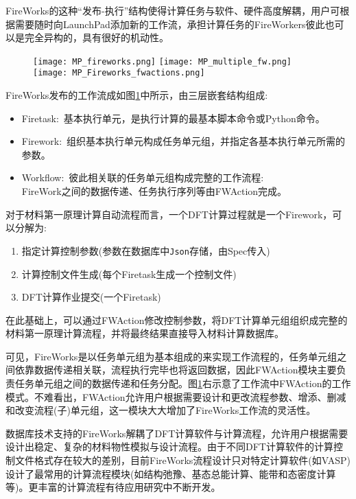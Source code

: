 \textrm{FireWorks}的这种“发布-执行”结构使得计算任务与软件、硬件高度解耦，用户可根据需要随时向\textrm{LaunchPad}添加新的工作流，承担计算任务的\textrm{FireWorkers}彼此也可以是完全异构的，具有很好的机动性。
\begin{figure}[h!]
\centering
\vspace*{-0.1in}
\texttt{[image: MP\_fireworks.png]}
\hskip 5pt
\texttt{[image: MP\_multiple\_fw.png]}
\hskip 5pt
\texttt{[image: MP\_Fireworks\_fwactions.png]}
\caption{\fontsize{7.2pt}{4.2pt}}%
\label{FireWorks_FW}
\end{figure} 
\textrm{FireWorks}发布的工作流成如图\ref{FireWorks_FW}中所示，由三层嵌套结构组成:
\begin{itemize}
	\item \textrm{Firetask}:~基本执行单元，是执行计算的最基本脚本命令或\textrm{Python}命令。
	\item \textrm{Firework}:~组织基本执行单元构成任务单元组，并指定各基本执行单元所需的参数。
	\item \textrm{Workflow}:~彼此相关联的任务单元组构成完整的工作流程:\\
		\textrm{FireWork}之间的数据传递、任务执行序列等由\textrm{FWAction}完成。
\end{itemize}
对于材料第一原理计算自动流程而言，一个\textrm{DFT}计算过程就是一个\textrm{Firework}，可以分解为:
\begin{enumerate}
	\item 指定计算控制参数(参数在数据库中\texttt{Json}存储，由\textrm{Spec}传入)
	\item 计算控制文件生成(每个\textrm{Firetask}生成一个控制文件)
	\item \textrm{DFT}计算作业提交(一个\textrm{Firetask})
\end{enumerate}
在此基础上，可以通过\textrm{FWAction}修改控制参数，将\textrm{DFT}计算单元组组织成完整的材料第一原理计算流程，并将最终结果直接导入材料计算数据库。

可见，\textrm{FireWorks}是以任务单元组为基本组成的来实现工作流程的，任务单元组之间依靠数据传递相关联，流程执行完毕也将返回数据，因此\textrm{FWAction}模块主要负责任务单元组之间的数据传递和任务分配。图\ref{FireWorks_FW}右示意了工作流中\textrm{FWAction}的工作模式。不难看出，\textrm{FWAction}允许用户根据需要设计和更改流程参数、增添、删减和改变流程(子)单元组，这一模块大大增加了\textrm{FireWorks}工作流的灵活性。

数据库技术支持的\textrm{FireWorks}解耦了\textrm{DFT}计算软件与计算流程，允许用户根据需要设计出稳定、复杂的材料物性模拟与设计流程。由于不同\textrm{DFT}计算软件的计算控制文件格式存在较大的差别，目前\textrm{FireWorks}流程设计只对特定计算软件(如\textrm{VASP})设计了最常用的计算流程模块(如结构弛豫、基态总能计算、能带和态密度计算等)。更丰富的计算流程有待应用研究中不断开发。

